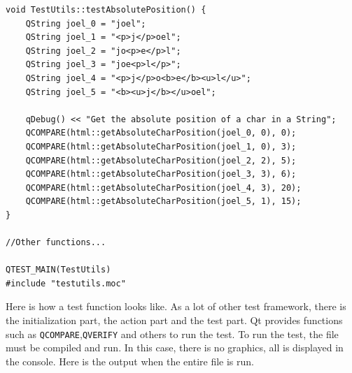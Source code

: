 \begin{lstlisting}
void TestUtils::testAbsolutePosition() {
    QString joel_0 = "joel";
    QString joel_1 = "<p>j</p>oel";
    QString joel_2 = "jo<p>e</p>l";
    QString joel_3 = "joe<p>l</p>";
    QString joel_4 = "<p>j</p>o<b>e</b><u>l</u>";
    QString joel_5 = "<b><u>j</b></u>oel";

    qDebug() << "Get the absolute position of a char in a String";
    QCOMPARE(html::getAbsoluteCharPosition(joel_0, 0), 0);
    QCOMPARE(html::getAbsoluteCharPosition(joel_1, 0), 3);
    QCOMPARE(html::getAbsoluteCharPosition(joel_2, 2), 5);
    QCOMPARE(html::getAbsoluteCharPosition(joel_3, 3), 6);
    QCOMPARE(html::getAbsoluteCharPosition(joel_4, 3), 20);
    QCOMPARE(html::getAbsoluteCharPosition(joel_5, 1), 15);
}

//Other functions...

QTEST_MAIN(TestUtils)
#include "testutils.moc"
\end{lstlisting}
Here is how a test function looks like. As a lot of other test framework, there is the initialization part, the action part and the test part. Qt provides functions such as \texttt{QCOMPARE},\texttt{QVERIFY} and others to run the test. To run the test, the file must be compiled and run. In this case, there is no graphics, all is displayed in the console. Here is the output when the entire file is run.

